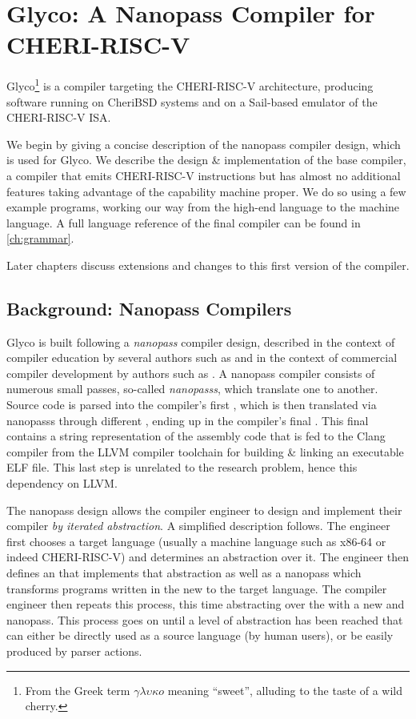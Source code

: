 \documentclass[main.tex]{subfiles}
\begin{document}
\onlyinsubfile{\mainmatter{}}

\chapter{Glyco: A Nanopass Compiler for CHERI-RISC-V}

Glyco\footnote{From the Greek term $\gamma\lambda\upsilon\kappa{}o$ meaning \enquote{sweet}, alluding to the taste of a wild cherry.} is a compiler targeting the CHERI-RISC-V architecture, producing software running on CheriBSD systems and on a Sail-based emulator of the CHERI-RISC-V ISA.

We begin by giving a concise description of the nanopass compiler design, which is used for Glyco. We describe the design \& implementation of the base compiler, a compiler that emits CHERI-RISC-V instructions but has almost no additional features taking advantage of the capability machine proper. We do so using a few example programs, working our way from the high-end language to the machine language. A full language reference of the final compiler can be found in \cref{ch:grammar}.

Later chapters discuss extensions and changes to this first version of the compiler.

\section{Background: Nanopass Compilers}
Glyco is built following a \emph{nanopass} compiler design, described in the context of compiler education by several authors such as \cite{educomp} and in the context of commercial compiler development by authors such as \cite{commcomp}. A nanopass compiler consists of numerous small passes, so-called \emph{\glspl{nanopass}}, which translate one \emph{\il{}} to another. Source code is parsed into the compiler’s first \il{}, which is then translated via \glspl{nanopass} through different \ils{}, ending up in the compiler's final \il{}. This final \il{} contains a string representation of the assembly code that is fed to the Clang compiler from the LLVM compiler toolchain for building \& linking an executable ELF file. This last step is unrelated to the research problem, hence this dependency on LLVM.

The nanopass design allows the compiler engineer to design and implement their compiler \emph{by iterated abstraction}. A simplified description follows. The engineer first chooses a target language (usually a machine language such as x86-64 or indeed CHERI-RISC-V) and determines an abstraction over it. The engineer then defines an \il{} that implements that abstraction as well as a \gls{nanopass} which transforms programs written in the new \il{} to the target language. The compiler engineer then repeats this process, this time abstracting over the \il{} with a new \il{} and \gls{nanopass}. This process goes on until a level of abstraction has been reached that can either be directly used as a source language (by human users), or be easily produced by parser actions.
\end{document}
